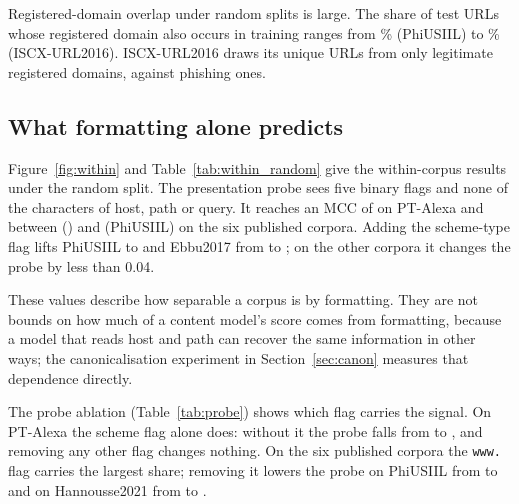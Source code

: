 Registered-domain overlap under random splits is large. The share of test URLs whose registered domain also occurs in training ranges from \SeenPhiUSIIL\% (PhiUSIIL) to \SeenISCXURL\% (ISCX-URL2016). ISCX-URL2016 draws its \UniqISCXURL{} unique URLs from only \RegLegitISCXURL{} legitimate registered domains, against \RegPhishISCXURL{} phishing ones.




\subsection{What formatting alone predicts}
\label{sec:probe}
Figure~\ref{fig:within} and Table~\ref{tab:within_random} give the within-corpus results under the random split. The presentation probe sees five binary flags and none of the characters of host, path or query. It reaches an MCC of \WPTAlexaRandomPresentation{} on PT-Alexa and between \PresMinMCC{} (\PresMinCorpus) and \WPhiUSIILRandomPresentation{} (PhiUSIIL) on the six published corpora. Adding the scheme-type flag lifts PhiUSIIL to \WPhiUSIILRandomPresentationHttps{} and Ebbu2017 from \WEbbuRandomPresentation{} to \WEbbuRandomPresentationHttps{}; on the other corpora it changes the probe by less than 0.04.

These values describe how separable a corpus is by formatting. They are not bounds on how much of a content model's score comes from formatting, because a model that reads host and path can recover the same information in other ways; the canonicalisation experiment in Section~\ref{sec:canon} measures that dependence directly.

The probe ablation (Table~\ref{tab:probe}) shows which flag carries the signal. On PT-Alexa the scheme flag alone does: without it the probe falls from \ProbePTAlexaAll{} to \ProbePTAlexaDropHasScheme{}, and removing any other flag changes nothing. On the six published corpora the \texttt{www.} flag carries the largest share; removing it lowers the probe on PhiUSIIL from \ProbePhiUSIILAll{} to \ProbePhiUSIILDropHasWww{} and on Hannousse2021 from \ProbeHannousseAll{} to \ProbeHannousseDropHasWww.

